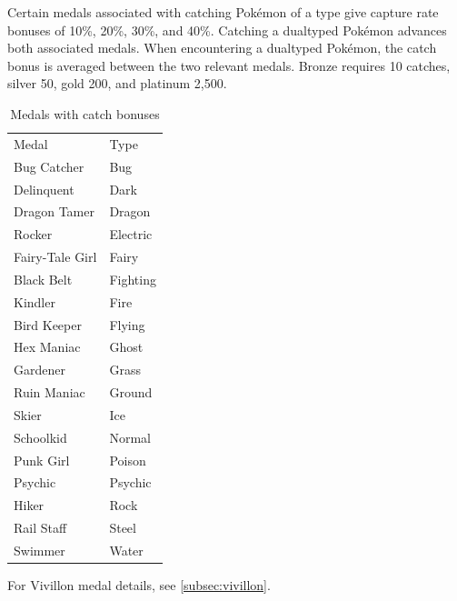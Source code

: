 Certain medals associated with catching Pokémon of a type give capture rate bonuses
of 10\%, 20\%, 30\%, and 40\%. Catching a dualtyped Pokémon advances both associated
medals. When encountering a dualtyped Pokémon, the catch bonus is averaged between
the two relevant medals. Bronze requires 10 catches, silver 50, gold 200, and
platinum 2,500.
\begin{table}[hb]
\centering
\begin{tabular}{ll}
  Medal & Type\\
  \Midrule
  Bug Catcher & Bug\\
  Delinquent & Dark\\
  Dragon Tamer & Dragon\\
  Rocker & Electric\\
  Fairy-Tale Girl & Fairy\\
  Black Belt & Fighting\\
  Kindler & Fire\\
  Bird Keeper & Flying\\
  Hex Maniac & Ghost\\
  Gardener & Grass\\
  Ruin Maniac & Ground\\
  Skier & Ice\\
  Schoolkid & Normal\\
  Punk Girl & Poison\\
  Psychic & Psychic\\
  Hiker & Rock\\
  Rail Staff & Steel\\
  Swimmer & Water\\
\end{tabular}
\caption{Medals with catch bonuses}
\label{table:medalcatch}
\end{table}
For Vivillon medal details, see \autoref{subsec:vivillon}.

